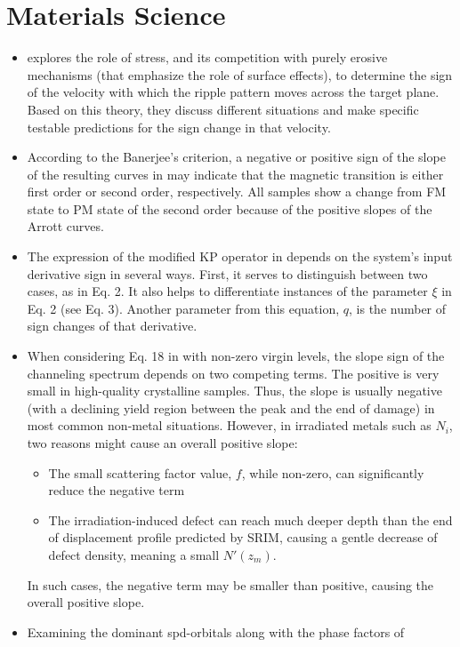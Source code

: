 \documentclass[11pt]{book}
\begin{document}
\section{Materials Science}
\begin{itemize}
\item \cite{moreno2015stress}
explores the role of stress, and its competition with purely erosive
mechanisms (that emphasize the role of surface effects), to determine
the sign of the velocity with which the ripple pattern moves across
the target plane. Based on this theory, they discuss different situations
and make specific testable predictions for the sign change in that
velocity.
\item According to the Banerjee's criterion, a negative or positive sign
of the slope of the resulting curves in \cite{ccetin2017effect}
may indicate that the magnetic transition is either first order or
second order, respectively. All samples show a change from FM state
to PM state of the second order because of the positive slopes of
the Arrott curves.
\item The expression of the modified KP operator in \cite{zhou2017model}
depends on the system's input derivative sign in several ways. First,
it serves to distinguish between two cases, as in Eq. 2. It also helps
to differentiate instances of the parameter $\xi$ in Eq. 2 (see Eq.
3). Another parameter from this equation, $q$, is the number of sign
changes of that derivative.
\item When considering Eq. 18 in \cite{jin2019channeling}
with non-zero virgin levels, the slope sign of the channeling spectrum
depends on two competing terms. The positive is very small in high-quality
crystalline samples. Thus, the slope is usually negative (with a declining
yield region between the peak and the end of damage) in most common
non-metal situations. However, in irradiated metals such as $N_{i}$,
two reasons might cause an overall positive slope:
\begin{itemize}
\item The small scattering factor value, $f$, while non-zero, can significantly
reduce the negative term
\item The irradiation-induced defect can reach much deeper depth than the
end of displacement profile predicted by SRIM, causing a gentle decrease
of defect density, meaning a small $N'\left(z_{m}\right)$.
\end{itemize}
In such cases, the negative term may be smaller than positive, causing
the overall positive slope.
\item Examining the dominant spd-orbitals along with the phase factors of

\end{itemize}
\end{document}
